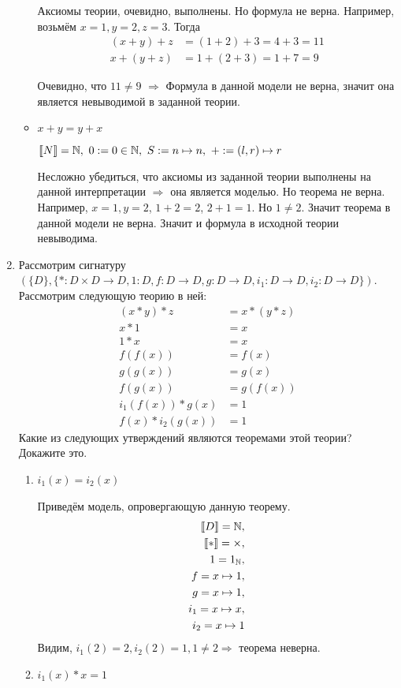 \begin{enumerate}
\begin{itemize}
Аксиомы теории, очевидно, выполнены. Но формула не верна. Например, возьмём $x = 1, y = 2, z = 3$. Тогда
\begin{align*}
(x + y) + z &= (1 + 2) + 3 = 4 + 3 = 11 \\
x + (y + z) &= 1 + (2 + 3) = 1 + 7 = 9
\end{align*} 

Очевидно, что $11 \neq 9$ $\Rightarrow$ Формула в данной модели не верна, значит она является невыводимой в заданной теории.

\item $x + y = y + x$

$\llb N \rrb = \mathbb{N}, \
0 := 0 \in \mathbb{N},\
S := n \mapsto n, \ 
+ := (l, r) \mapsto r$

Несложно убедиться, что аксиомы из заданной теории выполнены на данной интерпретации $\Rightarrow$ она является 
моделью. Но теорема не верна. Например, $x = 1, y = 2$, $1 + 2 = 2$, $2 + 1 = 1$. Но $1 \neq 2$. Значит теорема в 
данной модели не верна. Значит и формула в исходной теории невыводима.

\end{itemize}

\item Рассмотрим сигнатуру $(\{D\}, \{ * : D \times D \to D, 1 : D, f : D \to D, g : D \to D, i_1 : D \to D, i_2 : D \to D \})$.
    Рассмотрим следующую теорию в ней:
\begin{align*}
(x * y) * z & = x * (y * z) \\
x * 1 & = x \\
1 * x & = x \\
f(f(x)) & = f(x) \\
g(g(x)) & = g(x) \\
f(g(x)) & = g(f(x)) \\
i_1(f(x)) * g(x) & = 1 \\
f(x) * i_2(g(x)) & = 1
\end{align*}
Какие из следующих утверждений являются теоремами этой теории? Докажите это.
\begin{enumerate}
\item $i_1(x) = i_2(x)$\

Приведём модель, опровергающую данную теорему. 
\begin{align*}
\llbracket D \rrbracket = \mathbb{N}, \\
\llbracket * \rrbracket = \times, \\
1 = 1_{\mathbb{N}}, \\
f = x \mapsto 1, \\
g = x \mapsto 1, \\
i_1 = x \mapsto x, \\
i_2 = x \mapsto 1
\end{align*}
Видим, $i_1(2) = 2, i_2(2) = 1, 1 \neq 2 \Rightarrow$ теорема неверна.
\item $i_1(x) * x = 1$


\end{enumerate}
\end{enumerate}
